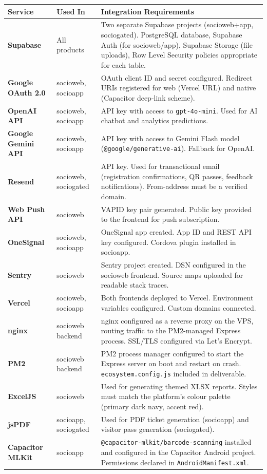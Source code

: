 \documentclass[12pt,a4paper]{article}
\begin{document}
\begin{longtable}{L{3.5cm} L{2.5cm} X}
\toprule
{}
\textbf{Service} & \textbf{Used In} & \textbf{Integration Requirements} \\
\midrule
\endhead
\textbf{Supabase} & All products & Two separate Supabase projects (socioweb+app, sociogated). PostgreSQL database, Supabase Auth (for socioweb/app), Supabase Storage (file uploads), Row Level Security policies appropriate for each table. \\
\addlinespace
\textbf{Google OAuth 2.0} & socioweb, socioapp & OAuth client ID and secret configured. Redirect URIs registered for web (Vercel URL) and native (Capacitor deep-link scheme). \\
\addlinespace
\textbf{OpenAI API} & socioweb, socioapp & API key with access to \texttt{gpt-4o-mini}. Used for AI chatbot and analytics predictions. \\
\addlinespace
\textbf{Google Gemini API} & socioweb, socioapp & API key with access to Gemini Flash model (\texttt{@google/generative-ai}). Fallback for OpenAI. \\
\addlinespace
\textbf{Resend} & socioweb, sociogated & API key. Used for transactional email (registration confirmations, QR passes, feedback notifications). From-address must be a verified domain. \\
\addlinespace
\textbf{Web Push API} & socioweb & VAPID key pair generated. Public key provided to the frontend for push subscription. \\
\addlinespace
\textbf{OneSignal} & socioweb, socioapp & OneSignal app created. App ID and REST API key configured. Cordova plugin installed in socioapp. \\
\addlinespace
\textbf{Sentry} & socioweb & Sentry project created. DSN configured in the socioweb frontend. Source maps uploaded for readable stack traces. \\
\addlinespace
\textbf{Vercel} & socioweb, socioapp & Both frontends deployed to Vercel. Environment variables configured. Custom domains connected. \\
\addlinespace
\textbf{nginx} & socioweb backend & nginx configured as a reverse proxy on the VPS, routing traffic to the PM2-managed Express process. SSL/TLS configured via Let's Encrypt. \\
\addlinespace
\textbf{PM2} & socioweb backend & PM2 process manager configured to start the Express server on boot and restart on crash. \texttt{ecosystem.config.js} included in deliverable. \\
\addlinespace
\textbf{ExcelJS} & socioweb & Used for generating themed XLSX reports. Styles must match the platform's colour palette (primary dark navy, accent red). \\
\addlinespace
\textbf{jsPDF} & socioapp, sociogated & Used for PDF ticket generation (socioapp) and visitor pass generation (sociogated). \\
\addlinespace
\textbf{Capacitor MLKit} & socioapp & \texttt{@capacitor-mlkit/barcode-scanning} installed and configured in the Capacitor Android project. Permissions declared in \texttt{AndroidManifest.xml}. \\
\bottomrule
\end{longtable}
\end{document}
